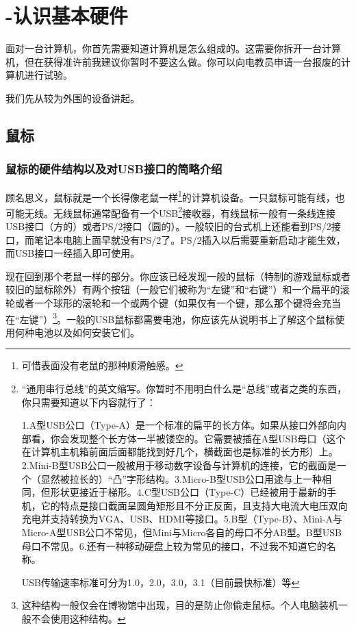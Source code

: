 \section{-认识基本硬件}
面对一台计算机，你首先需要知道计算机是怎么组成的。这需要你拆开一台计算机，但在获得准许前我建议你暂时不要这么做。你可以向电教员申请一台报废的计算机进行试验。\par
我们先从较为外围的设备讲起。
\subsection{鼠标}
\subsubsection{鼠标的硬件结构以及对USB接口的简略介绍}
顾名思义，鼠标就是一个长得像老鼠一样\footnote{可惜表面没有老鼠的那种顺滑触感。}的计算机设备。一只鼠标可能有线，也可能无线。无线鼠标通常配备有一个USB\footnote{“通用串行总线”的英文缩写。你暂时不用明白什么是“总线”或者之类的东西，你只需要知道以下内容就行了：\par 1.A型USB公口（Type-A）是一个标准的扁平的长方体。如果从接口外部向内部看，你会发现整个长方体一半被镂空的。它需要被插在A型USB母口（这个在计算机主机箱前面后面都能找到好几个，横截面也是标准的长方形）上。2.Mini-B型USB公口一般被用于移动数字设备与计算机的连接，它的截面是一个（显然被拉长的）“凸”字形结构。3.Micro-B型USB公口用途与上一种相同，但形状更接近于梯形。4.C型USB公口（Type-C）已经被用于最新的手机，它的特点是接口截面呈圆角矩形且不分正反面，且支持大电流大电压双向充电并支持转换为VGA、USB、HDMI等接口。5.B型（Type-B）、Mini-A与Micro-A型USB公口不常见，但Mini与Micro各自的母口不分AB型。B型USB母口不常见。6.还有一种移动硬盘上较为常见的接口，不过我不知道它的名称。\par USB传输速率标准可分为1.0，2.0，3.0，3.1（目前最快标准）等}接收器，有线鼠标一般有一条线连接USB接口（方的）或者PS/2接口（圆的）。一般较旧的台式机上还能看到PS/2接口，而笔记本电脑上面早就没有PS/2了。PS/2插入以后需要重新启动才能生效，而USB接口一经插入即可使用。\par
现在回到那个老鼠一样的部分。你应该已经发现一般的鼠标（特制的游戏鼠标或者较旧的鼠标除外）有两个按钮（一般它们被称为“左键”和“右键”）和一个扁平的滚轮或者一个球形的滚轮和一个或两个键（如果仅有一个键，那么那个键将会充当在“左键”）\footnote{这种结构一般仅会在博物馆中出现，目的是防止你偷走鼠标。个人电脑装机一般不会使用这种结构。}。一般的USB鼠标都需要电池，你应该先从说明书上了解这个鼠标使用何种电池以及如何安装它们。
